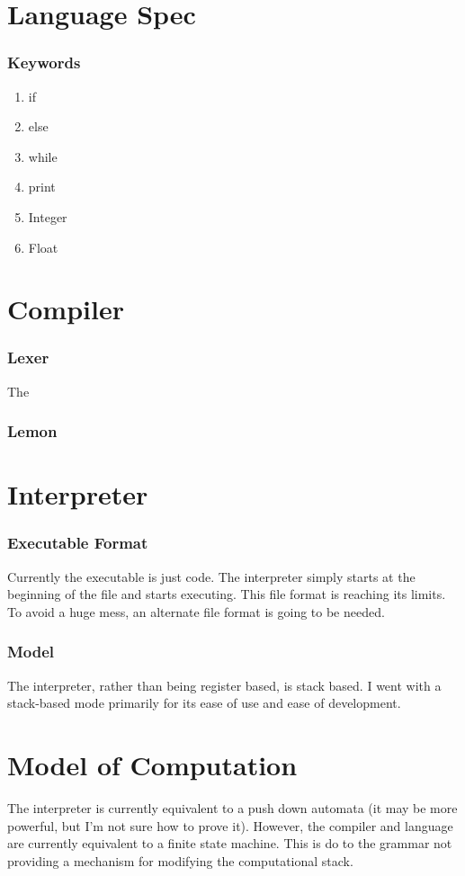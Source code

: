 \documentclass{report}
\begin{document}
\tableofcontents
\chapter{Language Spec}
	\subsection{Keywords}
		\begin{enumerate}
			\item if
			\item else
			\item while
			\item print
			\item Integer
			\item Float
		\end{enumerate}
	
\chapter{Compiler}
	\subsection{Lexer}
		The
	\subsection{Lemon}
\chapter{Interpreter}
	\subsection{Executable Format}
	Currently the executable is just code. The interpreter simply starts at the beginning of the file and starts executing.
	This file format is reaching its limits. To avoid a huge mess, an alternate file format is going to be needed. 
	\subsection{Model}
	The interpreter, rather than being register based, is stack based. I went with a stack-based mode primarily for its ease of use and ease of development. 


\chapter{Model of Computation}
	The interpreter is currently equivalent to a push down automata (it may be more powerful, but I'm not sure how to prove it). However, the compiler and language are currently equivalent to a finite state machine. This is do to the grammar not providing a mechanism for modifying the computational stack.
\end{document}
